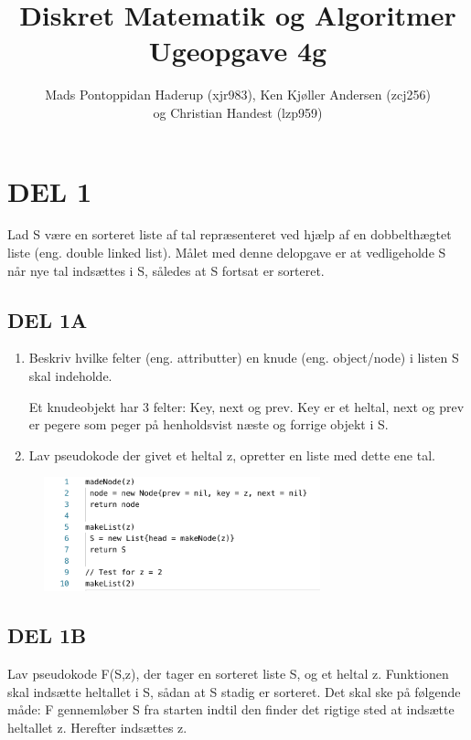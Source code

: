 \documentclass[a4paper]{article}
\title{Diskret Matematik og Algoritmer
\\Ugeopgave 4g}
\author{Mads Pontoppidan Haderup (xjr983), Ken Kjøller Andersen (zcj256)\\
og Christian Handest (lzp959)}
\begin{document}
\maketitle %



\pagebreak
\section{DEL 1}
Lad S være en sorteret liste af tal repræsenteret ved hjælp af en dobbelthægtet liste (eng. double linked list). Målet med denne delopgave er at vedligeholde S når nye tal indsættes i S, således at S fortsat er sorteret.

\subsection{DEL 1A}
\begin{enumerate}
\item Beskriv hvilke felter (eng. attributter) en knude (eng. object/node) i listen S skal indeholde. 

Et knudeobjekt har 3 felter: Key, next og prev. Key er et heltal, next
og prev er pegere som peger på henholdsvist næste og forrige objekt i S.

\item Lav pseudokode der givet et heltal z, opretter en liste med dette ene tal.
\end{enumerate}

\begin{figure}[h]
\centering
\includegraphics[width=8cm]{del1ab.png}
\end{figure}


\subsection{DEL 1B}
Lav pseudokode F(S,z), der tager en sorteret liste S, og et heltal z. Funktionen skal indsætte heltallet i S, sådan at S stadig er sorteret. Det skal ske på følgende måde: F gennemløber S fra starten indtil den finder det rigtige sted at indsætte heltallet z. Herefter indsættes z.
\end{document}
